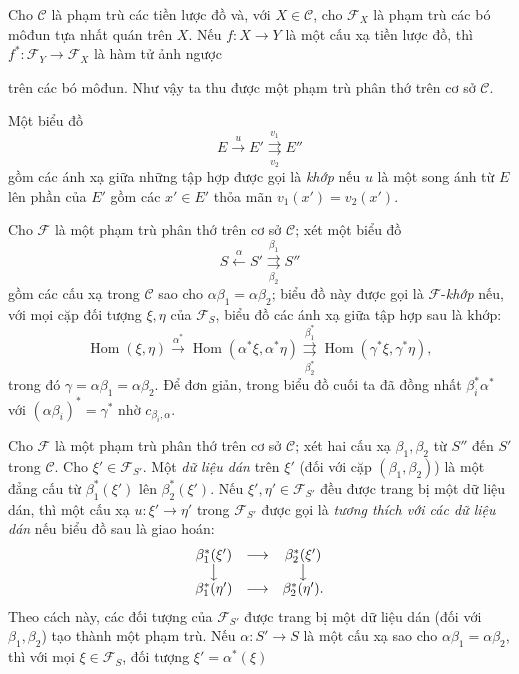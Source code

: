  Cho $\mathcal C$ là phạm trù các tiền lược đồ và, với
$X\in\mathcal C$, cho $\mathcal F_X$ là phạm trù các bó môđun tựa nhất quán
trên $X$. Nếu $f:X\longrightarrow Y$ là một cấu xạ tiền lược đồ, thì
$f^*:\mathcal F_Y\longrightarrow\mathcal F_X$ là hàm tử ảnh ngược

trên các bó môđun. Như vậy ta thu được một phạm trù phân thớ trên cơ sở
$\mathcal C$.

 Một biểu đồ
\[
  E\xrightarrow{u}E'
  \overset{v_1}{\underset{v_2}{\rightrightarrows}}E''
\]
gồm các ánh xạ giữa những tập hợp được gọi là \emph{khớp} nếu $u$ là một song
ánh từ $E$ lên phần của $E'$ gồm các $x'\in E'$ thỏa mãn
$v_1(x')=v_2(x')$.

 Cho $\mathcal F$ là một phạm trù phân thớ trên cơ sở
$\mathcal C$; xét một biểu đồ
\[
  \tag{+}
  S\xleftarrow{\alpha}S'
  \overset{\beta_1}{\underset{\beta_2}{\rightrightarrows}}S''
\]
gồm các cấu xạ trong $\mathcal C$ sao cho
$\alpha\beta_1=\alpha\beta_2$; biểu đồ này được gọi là
$\mathcal F$-\emph{khớp} nếu, với mọi cặp đối tượng $\xi,\eta$ của
$\mathcal F_S$, biểu đồ các ánh xạ giữa tập hợp sau là khớp:
\[
  \tag{+'}
  \operatorname{Hom}(\xi,\eta)
  \xrightarrow{\alpha^*}
  \operatorname{Hom}(\alpha^*\xi,\alpha^*\eta)
  \overset{\beta_1^*}{\underset{\beta_2^*}{\rightrightarrows}}
  \operatorname{Hom}(\gamma^*\xi,\gamma^*\eta),
\]
trong đó $\gamma=\alpha\beta_1=\alpha\beta_2$. Để đơn giản, trong biểu đồ cuối
ta đã đồng nhất $\beta_i^*\alpha^*$ với
$(\alpha\beta_i)^*=\gamma^*$ nhờ $c_{\beta_i,\alpha}$.

 Cho $\mathcal F$ là một phạm trù phân thớ trên cơ sở
$\mathcal C$; xét hai cấu xạ $\beta_1,\beta_2$ từ $S''$ đến $S'$ trong
$\mathcal C$. Cho $\xi'\in\mathcal F_{S'}$. Một \emph{dữ liệu dán} trên
$\xi'$ (đối với cặp $(\beta_1,\beta_2)$) là một đẳng cấu từ
$\beta_1^*(\xi')$ lên $\beta_2^*(\xi')$. Nếu
$\xi',\eta'\in\mathcal F_{S'}$ đều được trang bị một dữ liệu dán, thì một cấu
xạ $u:\xi'\longrightarrow\eta'$ trong $\mathcal F_{S'}$ được gọi là
\emph{tương thích với các dữ liệu dán} nếu biểu đồ sau là giao hoán:
\[
\begin{array}{ccc}
  \beta_1^*(\xi') & \longrightarrow & \beta_2^*(\xi') \\
  \big\downarrow && \big\downarrow \\
  \beta_1^*(\eta') & \longrightarrow & \beta_2^*(\eta').
\end{array}
\]
Theo cách này, các đối tượng của $\mathcal F_{S'}$ được trang bị một dữ liệu
dán (đối với $\beta_1,\beta_2$) tạo thành một phạm trù. Nếu
$\alpha:S'\longrightarrow S$ là một cấu xạ sao cho
$\alpha\beta_1=\alpha\beta_2$, thì với mọi $\xi\in\mathcal F_S$, đối tượng
$\xi'=\alpha^*(\xi)$


